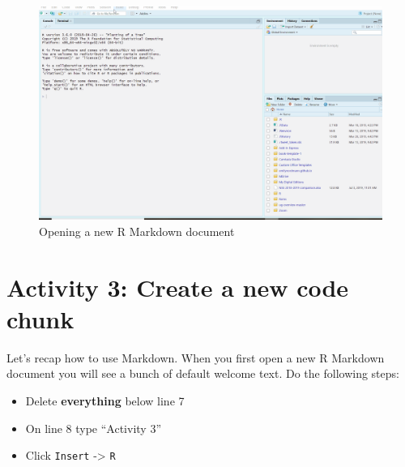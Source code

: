 \documentclass[
  oneside]{book}
\providecommand{\tightlist}{%
  \setlength{\itemsep}{0pt}\setlength{\parskip}{0pt}}
\begin{document}
\begin{figure}

{\centering \includegraphics[width=1\linewidth]{images/markdown_new} 

}

\caption{Opening a new R Markdown document}\label{fig:img-new-markdownb}
\end{figure}

\hypertarget{activity-3-create-a-new-code-chunk}{%
\section{Activity 3: Create a new code chunk}\label{activity-3-create-a-new-code-chunk}}

Let's recap how to use Markdown. When you first open a new R Markdown document you will see a bunch of default welcome text. Do the following steps:

\begin{itemize}
\tightlist
\item
  Delete \textbf{everything} below line 7\\
\item
  On line 8 type ``Activity 3''\\
\item
  Click \texttt{Insert} -\textgreater{} \texttt{R}
\end{itemize}
\end{document}
